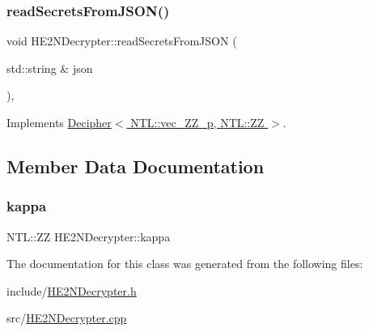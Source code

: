 \subsubsection{\texorpdfstring{read\+Secrets\+From\+J\+S\+O\+N()}{readSecretsFromJSON()}}
{\footnotesize\ttfamily void H\+E2\+N\+Decrypter\+::read\+Secrets\+From\+J\+S\+ON (\begin{DoxyParamCaption}\item[{std\+::string \&}]{json }\end{DoxyParamCaption})\hspace{0.3cm}{\ttfamily [override]}, {\ttfamily [virtual]}}



Implements \hyperlink{classDecipher_a39aea002012130201e12a8fa7d84dda5}{Decipher$<$ N\+T\+L\+::vec\+\_\+\+Z\+Z\+\_\+p, N\+T\+L\+::\+Z\+Z $>$}.



\subsection{Member Data Documentation}
\mbox{\label{classHE2NDecrypter_ad3233fd048ef07f31e4f40ea941cce91}} 
\subsubsection{\texorpdfstring{kappa}{kappa}}
{\footnotesize\ttfamily N\+T\+L\+::\+ZZ H\+E2\+N\+Decrypter\+::kappa\hspace{0.3cm}{\ttfamily [private]}}



The documentation for this class was generated from the following files\+:\begin{DoxyCompactItemize}
\item 
include/\hyperlink{HE2NDecrypter_8h}{H\+E2\+N\+Decrypter.\+h}\item 
src/\hyperlink{HE2NDecrypter_8cpp}{H\+E2\+N\+Decrypter.\+cpp}\end{DoxyCompactItemize}
